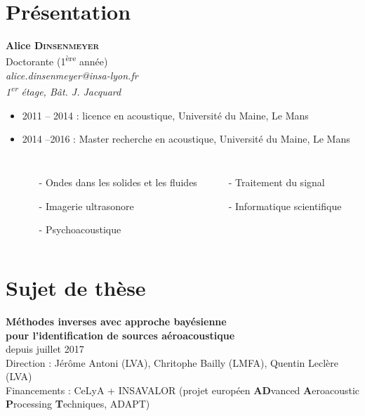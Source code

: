 \section{Présentation}


\begin{frame}
	\begin{center}
		\textbf{Alice \textsc{Dinsenmeyer}}\\
		\footnotesize{Doctorante (1\textsuperscript{ère} année)\\[0.5cm]
		\textit{alice.dinsenmeyer@insa-lyon.fr\\
		1\textsuperscript{er} étage, Bât. J. Jacquard}}
			
	\end{center}
	\begin{itemize}
		\item 2011 -- 2014 : licence en acoustique, Université du Maine, Le Mans %
		\item 2014 --2016 : Master recherche en acoustique, Université du Maine, Le Mans %
		\begin{columns}
			\hspace{2cm}
			\begin{itemize}
				\item[-] Ondes dans les solides et les fluides
				\item[-] Imagerie ultrasonore
				\item[-] Psychoacoustique
			\end{itemize}
			\begin{itemize}
				\item[-] Traitement du signal
				\item[-] Informatique scientifique
			\end{itemize}
		\end{columns}
	\end{itemize}
\end{frame}

\section{Sujet de thèse}


\begin{frame}
	\centering
	\textbf{ Méthodes inverses avec approche bayésienne \\pour l'identification de sources aéroacoustique}\\
	\footnotesize{depuis juillet 2017}\\[0.5cm]
	Direction : Jérôme Antoni (LVA), Chritophe Bailly (LMFA), Quentin Leclère (LVA)\\[0.5cm]
	Financements : CeLyA + INSAVALOR (projet européen \textbf{AD}vanced \textbf{A}eroacoustic \textbf{P}rocessing \textbf{T}echniques, ADAPT)
\end{frame}

